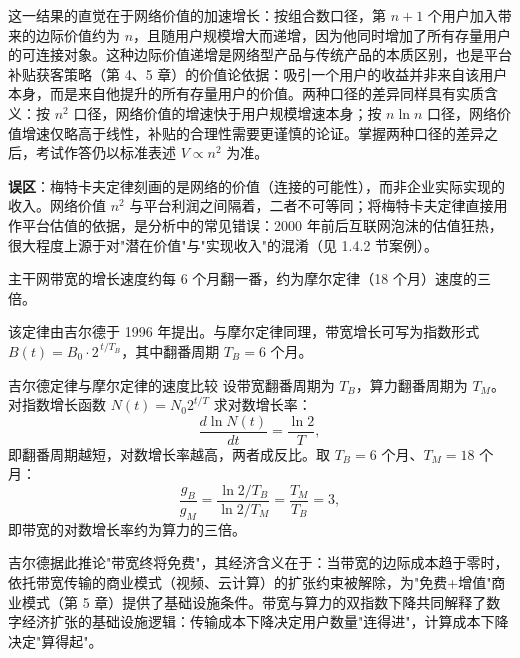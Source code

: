 这一结果的直觉在于网络价值的加速增长：按组合数口径，第 $n+1$ 个用户加入带来的边际价值约为 $n$，且随用户规模增大而递增，因为他同时增加了所有存量用户的可连接对象。这种边际价值递增是网络型产品与传统产品的本质区别，也是平台补贴获客策略（第 4、5 章）的价值论依据：吸引一个用户的收益并非来自该用户本身，而是来自他提升的所有存量用户的价值。两种口径的差异同样具有实质含义：按 $n^2$ 口径，网络价值的增速快于用户规模增速本身；按 $n\ln n$ 口径，网络价值增速仅略高于线性，补贴的合理性需要更谨慎的论证。掌握两种口径的差异之后，考试作答仍以标准表述 $V\propto n^2$ 为准。

\begin{misconception}
\textbf{误区}：梅特卡夫定律刻画的是网络的价值（连接的可能性），而非企业实际实现的收入。网络价值 $n^2$ 与平台利润之间隔着，二者不可等同；将梅特卡夫定律直接用作平台估值的依据，是分析中的常见错误：2000 年前后互联网泡沫的估值狂热，很大程度上源于对"潜在价值"与"实现收入"的混淆（见 1.4.2 节案例）。
\end{misconception}

\begin{definition}
主干网带宽的增长速度约每 6 个月翻一番，约为摩尔定律（18 个月）速度的三倍。
\end{definition}

该定律由吉尔德于 1996 年提出。与摩尔定律同理，带宽增长可写为指数形式 $B(t) = B_0 \cdot 2^{\,t/T_B}$，其中翻番周期 $T_B = 6$ 个月。

\begin{derivation}{吉尔德定律与摩尔定律的速度比较}{}
设带宽翻番周期为 $T_B$，算力翻番周期为 $T_M$。对指数增长函数 $N(t)=N_0 2^{t/T}$ 求对数增长率：
\[
\frac{d \ln N(t)}{dt} = \frac{\ln 2}{T},
\]
即翻番周期越短，对数增长率越高，两者成反比。取 $T_B = 6$ 个月、$T_M = 18$ 个月：
\[
\frac{g_B}{g_M} = \frac{\ln 2 / T_B}{\ln 2 / T_M} = \frac{T_M}{T_B} = 3,
\]
即带宽的对数增长率约为算力的三倍。
\end{derivation}

吉尔德据此推论"带宽终将免费"，其经济含义在于：当带宽的边际成本趋于零时，依托带宽传输的商业模式（视频、云计算）的扩张约束被解除，为"免费+增值"商业模式（第 5 章）提供了基础设施条件。带宽与算力的双指数下降共同解释了数字经济扩张的基础设施逻辑：传输成本下降决定用户数量"连得进"，计算成本下降决定"算得起"。

